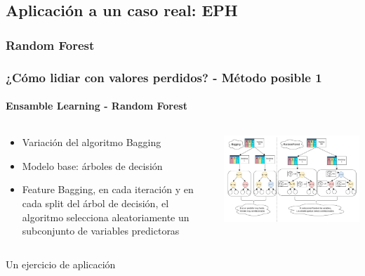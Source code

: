 \documentclass{beamer}
\begin{document}
\subsection{Aplicación a un caso real: EPH}
\subsubsection{Random Forest}
\begin{frame}
	\frametitle{¿Cómo lidiar con valores perdidos? - Método posible 1}
	\framesubtitle{Ensamble Learning - Random Forest}
	\begin{columns}
		\begin{column}{0.48\textwidth}
			\begin{itemize}		
				\item Variación del algoritmo Bagging
				\item Modelo base: árboles de decisión
				\item Feature Bagging, en cada iteración y en cada split del árbol de decisión, el algoritmo selecciona aleatoriamente un subconjunto de variables predictoras
			\end{itemize}
		\end{column}
		\begin{column}{0.85\textwidth}
			\includegraphics[width=0.67\linewidth, height=0.6\textheight]{img/random_forest}
		\end{column}
	\end{columns}
\end{frame}

\begin{frame}
	\begin{center}
		{\huge Un ejercicio de aplicación
			\linebreak
			\linebreak
			\linebreak
			\linebreak}
	\end{center}
\end{frame}
\end{document}
